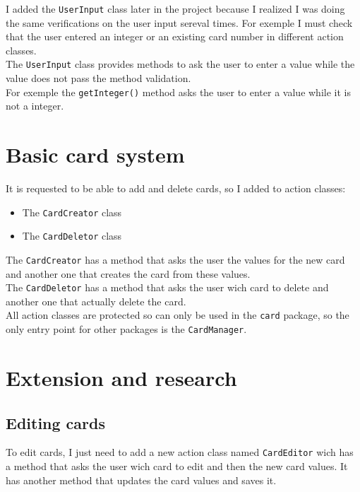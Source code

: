 \documentclass{article}
\begin{document}
I added the \texttt{UserInput} class later in the project because I
realized I was doing the same verifications on the user input sereval
times. For exemple I must check that the user entered an integer or an
existing card number in different action classes.\\

\noindent
The \texttt{UserInput} class provides methods to ask the user to enter a
value while the value does not pass the method validation.\\

\noindent
For exemple the \texttt{getInteger()} method asks the user to enter a
value while it is not a integer.

\section{Basic card system}

It is requested to be able to add and delete cards, so I added to action
classes:

\begin{itemize}
\itemsep0pt\parskip0pt
\item The \texttt{CardCreator} class
\item The \texttt{CardDeletor} class
\end{itemize}

\noindent
The \texttt{CardCreator} has a method that asks the user the values for
the new card and another one that creates the card from these values.\\

\noindent
The \texttt{CardDeletor} has a method that asks the user wich card to
delete and another one that actually delete the card.\\

\noindent
All action classes are protected so can only be used in the
\texttt{card} package, so the only entry point for other packages is the
\texttt{CardManager}.

\section{Extension and research}

\subsection{Editing cards}

To edit cards, I just need to add a new action class named
\texttt{CardEditor} wich has a method that asks the user wich card to
edit and then the new card values. It has another method that updates
the card values and saves it.
\end{document}
